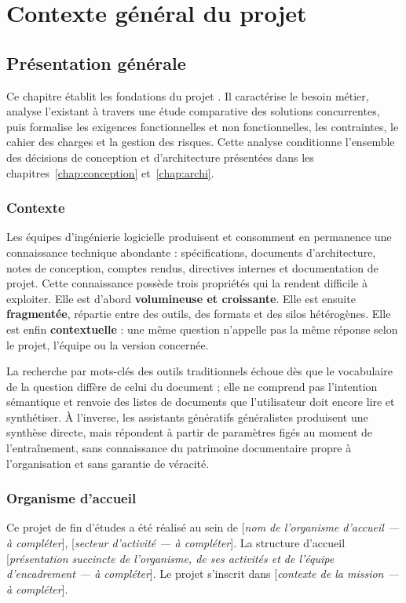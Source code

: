 \chapter{Contexte général du projet}
\label{chap:contexte}

\section{Présentation générale}
Ce chapitre établit les fondations du projet \devpilot{}. Il caractérise le
besoin métier, analyse l'existant à travers une étude comparative des solutions
concurrentes, puis formalise les exigences fonctionnelles et non fonctionnelles,
les contraintes, le cahier des charges et la gestion des risques. Cette analyse
conditionne l'ensemble des décisions de conception et d'architecture présentées
dans les chapitres~\ref{chap:conception} et~\ref{chap:archi}.

\subsection{Contexte}
Les équipes d'ingénierie logicielle produisent et consomment en permanence une
connaissance technique abondante : spécifications, documents d'architecture, notes
de conception, comptes rendus, directives internes et documentation de projet.
Cette connaissance possède trois propriétés qui la rendent difficile à exploiter.
Elle est d'abord \textbf{volumineuse et croissante}. Elle est ensuite
\textbf{fragmentée}, répartie entre des outils, des formats et des silos
hétérogènes. Elle est enfin \textbf{contextuelle} : une même question n'appelle
pas la même réponse selon le projet, l'équipe ou la version concernée.

La recherche par mots-clés des outils traditionnels échoue dès que le vocabulaire
de la question diffère de celui du document ; elle ne comprend pas l'intention
sémantique et renvoie des listes de documents que l'utilisateur doit encore lire
et synthétiser. À l'inverse, les assistants génératifs généralistes produisent
une synthèse directe, mais répondent à partir de paramètres figés au moment de
l'entraînement, sans connaissance du patrimoine documentaire propre à
l'organisation et sans garantie de véracité.

\subsection{Organisme d'accueil}
Ce projet de fin d'études a été réalisé au sein de [\textit{nom de l'organisme
d'accueil — à compléter}], [\textit{secteur d'activité — à compléter}]. La
structure d'accueil [\textit{présentation succincte de l'organisme, de ses
activités et de l'équipe d'encadrement — à compléter}]. Le projet s'inscrit dans
[\textit{contexte de la mission — à compléter}].

